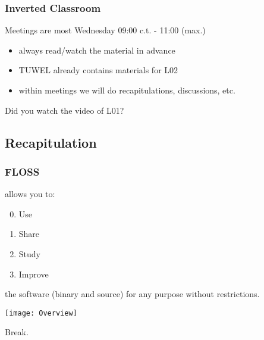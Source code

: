 \begin{frame}
	\frametitle{Inverted Classroom}
	Meetings are most Wednesday 09:00 c.t. - 11:00 (max.)

	\begin{itemize}
		\item always read/watch the material in advance
		\item TUWEL already contains materials for L02
		\item within meetings we will do recapitulations, discussions, etc.
	\end{itemize}

	\begin{task}
	Did you watch the video of L01?
	\end{task}
\end{frame}


\subsection{Recapitulation}

\begin{frame}
	\frametitle{FLOSS}

	\floss{} allows you to:
	\pause
	\vspace{1em}
	\begin{enumerate}
		\setcounter{enumi}{-1}
		\item Use
		\item Share
		\item Study
		\item Improve
	\end{enumerate}
	\vspace{1em}
	the software (binary and source) for any purpose without restrictions.
\end{frame}

\begin{frame}
	\texttt{[image: Overview]}
\end{frame}




\begin{assignment}
	\begin{task}
	Break.
	\end{task}
\end{assignment}


